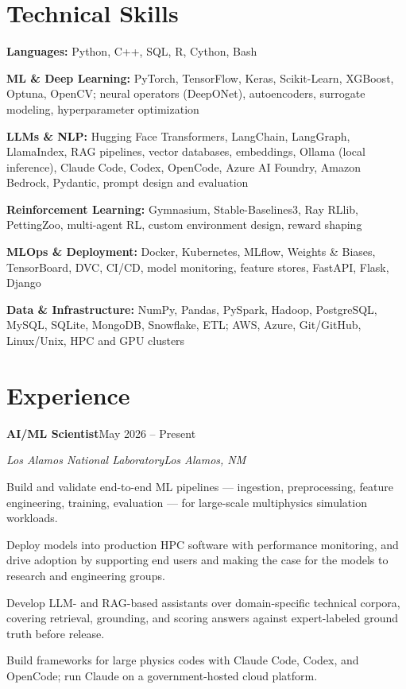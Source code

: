 \documentclass[10.5pt,letterpaper]{article}
\newcommand{\role}[4]{%
  \vspace{3pt}%
  \noindent\textbf{#1}\hfill\textcolor{muted}{#2}\par
  \noindent\textit{#3}\hfill\textcolor{muted}{\textit{#4}}\par
  \vspace{1pt}%
}
\newcommand{\skillrow}[2]{\noindent\textbf{#1:} #2\par\vspace{1.5pt}}
\begin{document}
\section{Technical Skills}
\skillrow{Languages}{Python, C++, SQL, R, Cython, Bash}
\skillrow{ML \& Deep Learning}{PyTorch, TensorFlow, Keras, Scikit-Learn, XGBoost, Optuna, OpenCV; neural
  operators (DeepONet), autoencoders, surrogate modeling, hyperparameter optimization}
\skillrow{LLMs \& NLP}{Hugging Face Transformers, LangChain, LangGraph, LlamaIndex, RAG pipelines,
  vector databases, embeddings, Ollama (local inference), Claude Code, Codex, OpenCode, Azure AI Foundry, Amazon Bedrock, Pydantic, prompt design and evaluation}
\skillrow{Reinforcement Learning}{Gymnasium, Stable-Baselines3, Ray RLlib, PettingZoo, multi-agent RL,
  custom environment design, reward shaping}
\skillrow{MLOps \& Deployment}{Docker, Kubernetes, MLflow, Weights \& Biases, TensorBoard, DVC, CI/CD,
  model monitoring, feature stores, FastAPI, Flask, Django}
\skillrow{Data \& Infrastructure}{NumPy, Pandas, PySpark, Hadoop, PostgreSQL, MySQL, SQLite, MongoDB,
  Snowflake, ETL; AWS, Azure, Git/GitHub, Linux/Unix, HPC and GPU clusters}

\section{Experience}

\role{AI/ML Scientist}{May 2026 -- Present}{Los Alamos National Laboratory}{Los Alamos, NM}
\begin{tight}
  \item Build and validate end-to-end ML pipelines --- ingestion, preprocessing, feature
    engineering, training, evaluation --- for large-scale multiphysics simulation workloads.
  \item Deploy models into production HPC software with performance monitoring, and drive
    adoption by supporting end users and making the case for the models to research and
    engineering groups.
  \item Develop LLM- and RAG-based assistants over domain-specific technical corpora, covering
    retrieval, grounding, and scoring answers against expert-labeled ground truth before release.
  \item Build frameworks for large physics codes with Claude Code, Codex, and OpenCode; run
    Claude on a government-hosted cloud platform.
\end{tight}
\end{document}
